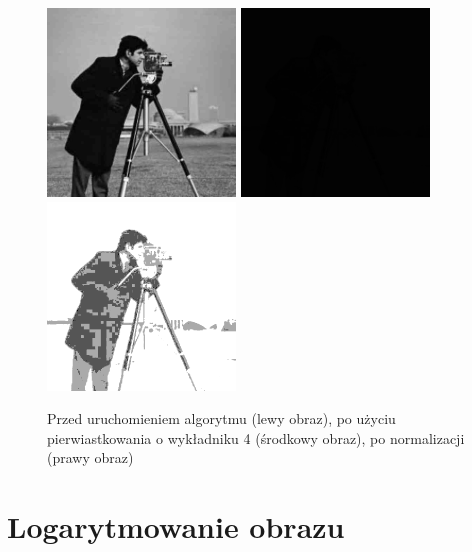 \documentclass[a4paper,12pt]{book}
\begin{document}
\begin{figure}[H]
	\caption{Przed uruchomieniem algorytmu (lewy obraz), po użyciu pierwiastkowania o wykładniku 4 (środkowy obraz), po normalizacji (prawy obraz)}
	\includegraphics[width=5cm, height=5cm]{man-unmodified.jpg}
	\includegraphics[width=5cm, height=5cm]{2-6/root-gray-photoman-4.png}
	\includegraphics[width=5cm, height=5cm]{2-6/root-gray-photoman-4-norm.png}
\end{figure}

\section{Logarytmowanie obrazu}
\end{document}
